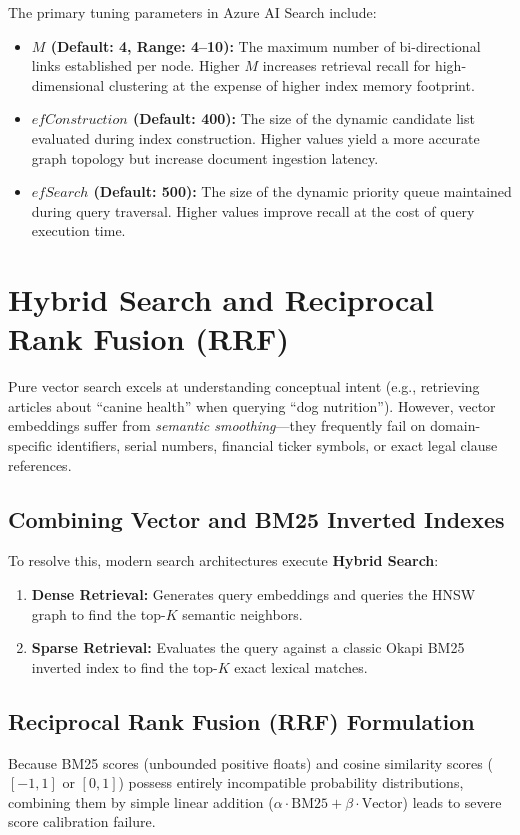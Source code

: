 The primary tuning parameters in Azure AI Search include:
\begin{itemize}[leftmargin=12pt]
  \item \textbf{$M$ (Default: 4, Range: 4--10):} The maximum number of bi-directional links established per node. Higher $M$ increases retrieval recall for high-dimensional clustering at the expense of higher index memory footprint.
  \item \textbf{$efConstruction$ (Default: 400):} The size of the dynamic candidate list evaluated during index construction. Higher values yield a more accurate graph topology but increase document ingestion latency.
  \item \textbf{$efSearch$ (Default: 500):} The size of the dynamic priority queue maintained during query traversal. Higher values improve recall at the cost of query execution time.
\end{itemize}

\section{Hybrid Search and Reciprocal Rank Fusion (RRF)}

Pure vector search excels at understanding conceptual intent (e.g., retrieving articles about ``canine health'' when querying ``dog nutrition''). However, vector embeddings suffer from \emph{semantic smoothing}---they frequently fail on domain-specific identifiers, serial numbers, financial ticker symbols, or exact legal clause references.

\subsection{Combining Vector and BM25 Inverted Indexes}
To resolve this, modern search architectures execute \textbf{Hybrid Search}:
\begin{enumerate}[leftmargin=15pt]
  \item \textbf{Dense Retrieval:} Generates query embeddings and queries the HNSW graph to find the top-$K$ semantic neighbors.
  \item \textbf{Sparse Retrieval:} Evaluates the query against a classic Okapi BM25 inverted index to find the top-$K$ exact lexical matches.
\end{enumerate}

\subsection{Reciprocal Rank Fusion (RRF) Formulation}
Because BM25 scores (unbounded positive floats) and cosine similarity scores ($[-1, 1]$ or $[0, 1]$) possess entirely incompatible probability distributions, combining them by simple linear addition ($\alpha \cdot \text{BM25} + \beta \cdot \text{Vector}$) leads to severe score calibration failure.


